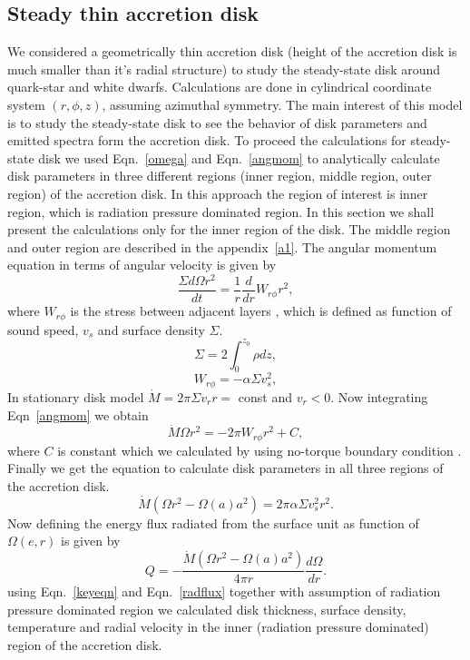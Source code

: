 \documentclass[useAMS,usenatbib]{mn2e}
\begin{document}
\subsection{Steady thin accretion disk}
We considered a geometrically thin accretion disk (height of the accretion disk is much smaller than it's radial structure) to study the steady-state disk around quark-star and white dwarfs. Calculations are done in cylindrical coordinate system $(r,\phi,z)$, assuming azimuthal symmetry. The main interest of this model is to study the steady-state disk to see the behavior of disk parameters and emitted spectra form the accretion disk. To proceed the calculations for steady-state disk we used Eqn.~\ref{omega} and Eqn.~\ref{angmom} to analytically calculate disk parameters in three different regions (inner region, middle region, outer region) of the accretion disk. In this approach the region of interest is inner region, which is radiation pressure dominated region. In this section we shall present the calculations only for the inner region of the disk. The middle region and outer region are described in the appendix~\ref{a1}. The angular momentum equation in terms of angular velocity is given by
\begin{equation}
\frac{\Sigma d\Omega r^2}{dt} = \frac{1}{r}\frac{d}{dr}W_{r\phi}r^2,
\label{angmom}
\end{equation}
where $W_{r\phi}$ is the stress between adjacent layers \citep{1973A&A....24..337S}, which is defined as function of sound speed, $v_s$ and surface density $\Sigma$.
\begin{equation}
\Sigma = 2\int_0^{z_0} \rho dz,
\end{equation}
\begin{equation}
W_{r\phi} = -\alpha\Sigma v_s^2,
\end{equation}
In stationary disk model $\dot{M} = 2\pi\Sigma v_r r =$ const and $v_r < 0$. Now integrating Eqn~\ref{angmom} we obtain
\begin{equation}
\dot{M}\Omega r^2 = -2\pi W_{r\phi}r^2 + C,
\label{const}
\end{equation}
where $C$ is constant which we calculated by using no-torque boundary condition \citep{1973A&A....24..337S}. Finally we get the equation to calculate disk parameters in all three regions of the accretion disk.
\begin{equation}
\dot{M}\left(\Omega r^2 - \Omega(a)a^2\right) = 2\pi\alpha\Sigma v_s^2 r^2.
\label{keyeqn}
\end{equation}
Now defining the energy flux radiated from the surface unit as function of $\Omega (e,r)$ is given by
\begin{equation}
Q = -\frac{\dot{M}\left(\Omega r^2 - \Omega(a)a^2\right)}{4\pi r}\frac{d\Omega}{dr}.
\label{radflux}
\end{equation}
using Eqn.~\ref{keyeqn} and Eqn.~\ref{radflux} together with assumption of radiation pressure dominated region we calculated disk thickness, surface density, temperature and radial velocity in the inner (radiation pressure dominated) region of the accretion disk.
\end{document}
